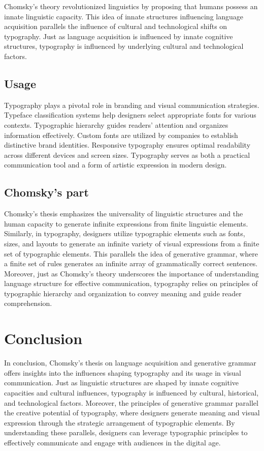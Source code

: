 \documentclass[11pt]{article}
\begin{document}
    Chomsky's theory revolutionized linguistics by proposing that humans possess an innate linguistic
    capacity. This idea of innate structures influencing language acquisition parallels the influence
    of cultural and technological shifts on typography.\cite{ModernTypo}
    Just as language acquisition is influenced by
    innate cognitive structures, typography is influenced by underlying cultural and technological factors.\cite{LR}

    \subsection{Usage}
    Typography plays a pivotal role in branding and visual communication strategies.\cite{LR}
    Typeface classification systems help designers select appropriate fonts for various contexts.
    Typographic hierarchy guides readers' attention and organizes information effectively.\cite{hmota}
    Custom fonts are utilized by companies to establish distinctive brand identities.\cite{types}
    Responsive typography ensures optimal readability across different devices and screen sizes.\cite{typo}
    Typography serves as both a practical communication tool and a form of artistic expression in modern design.\cite{emotions}
    \subsection{Chomsky's part}
    Chomsky's thesis emphasizes the universality of linguistic structures and the human capacity to generate
    infinite expressions from finite linguistic elements. Similarly, in typography, designers utilize typographic
    elements such as fonts, sizes, and layouts to generate an infinite variety of visual expressions from a finite
    set of typographic elements.\cite{culturalenviro}
    This parallels the idea of generative grammar, where a finite set of rules generates
    an infinite array of grammatically correct sentences.\cite{mag}
    Moreover, just as Chomsky's theory underscores the importance
    of understanding language structure for effective communication, typography relies on principles of typographic
    hierarchy and organization to convey meaning and guide reader comprehension.\cite{LR}

    \section{Conclusion}
    In conclusion, Chomsky's thesis on language acquisition and generative grammar offers insights into the influences
    shaping typography and its usage in visual communication. Just as linguistic structures are shaped by innate
    cognitive capacities and cultural influences, typography is influenced by cultural, historical, and technological
    factors.\cite{critisism}
    Moreover, the principles of generative grammar parallel the creative potential of typography,
    where designers generate meaning and visual expression through the strategic arrangement of typographic elements.
    By understanding these parallels, designers can leverage typographic principles to effectively communicate
    and engage with audiences in the digital age.



\end{document}
